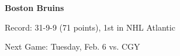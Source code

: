\textbf{Boston Bruins}

Record: 31-9-9 (71 points), 1st in NHL Atlantic 

Next Game: Tuesday, Feb. 6 vs. CGY